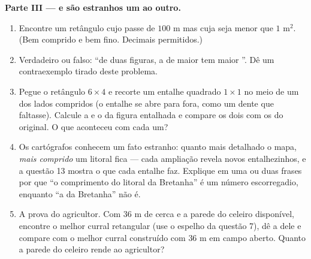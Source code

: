 \begin{problem}
\medskip
\noindent\textbf{Parte III ---  e  são estranhos um ao
outro.}
\begin{enumerate}[resume]
  \item Encontre um retângulo cujo  passe de $100$ m mas cuja
         seja menor que $1$ m$^2$. (Bem comprido e bem fino.
        Decimais permitidos.)
  \item Verdadeiro ou falso: ``de duas figuras, a de maior 
        tem maior ''. Dê um contraexemplo tirado deste problema.
  \item Pegue o retângulo $6 \times 4$ e recorte um entalhe quadrado
        $1 \times 1$ no meio de um dos lados compridos (o entalhe se
        abre para fora, como um dente que faltasse). Calcule a  e o
         da figura entalhada e compare os dois com os do
        original. O que aconteceu com cada um?
  \item Os cartógrafos conhecem um fato estranho: quanto mais detalhado
        o mapa, \emph{mais comprido} um litoral fica --- cada ampliação
        revela novos entalhezinhos, e a questão 13 mostra o que cada
        entalhe faz. Explique em uma ou duas frases por que ``o
        comprimento do litoral da Bretanha'' é um número escorregadio,
        enquanto ``a  da Bretanha'' não é.
  \item A prova do agricultor. Com $36$ m de cerca e a parede do
        celeiro disponível, encontre o melhor curral retangular (use o
        espelho da questão 7), dê a  dele e compare com o melhor
        curral construído com $36$ m em campo aberto. Quanto a parede
        do celeiro rende ao agricultor?
\end{enumerate}
\end{problem}
